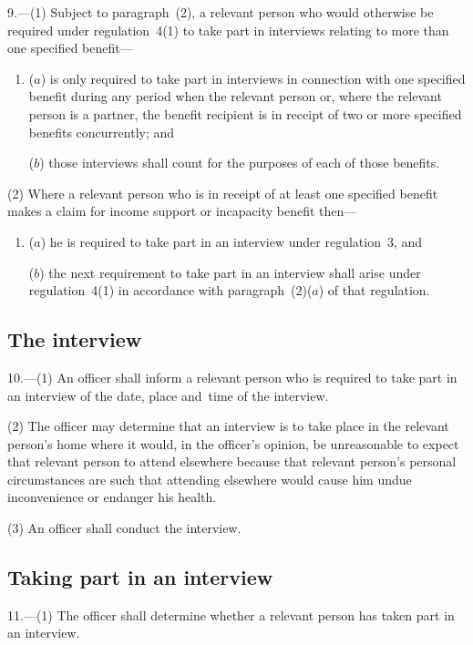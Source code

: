 \documentclass[12pt,a4paper]{article}
\begin{document}
9.---(1)  Subject to paragraph~(2), a relevant person who would otherwise be required under regulation~4(1) to take part in interviews relating to more than one specified benefit—
\begin{enumerate}\item[]
($a$) is only required to take part in interviews in connection with one specified benefit during any period when the relevant person or, where the relevant person is a partner, the benefit recipient is in receipt of two or more specified benefits concurrently; and

($b$) those interviews shall count for the purposes of each of those benefits.
\end{enumerate}

(2) Where a relevant person who is in receipt of at least one specified benefit makes a claim for income support or incapacity benefit then—
\begin{enumerate}\item[]
($a$) he is required to take part in an interview under regulation~3, and

($b$) the next requirement to take part in an interview shall arise under regulation~4(1) in accordance with paragraph~(2)($a$)  of that regulation.
\end{enumerate}

\subsection[10. The interview]{The interview}

10.---(1)  An officer shall inform a relevant person who is required to take part in an interview of the date, place and~time of the interview.

(2) The officer may determine that an interview is to take place in the relevant person’s home where it would, in the officer’s opinion, be unreasonable to expect that relevant person to attend elsewhere because that relevant person’s personal circumstances are such that attending elsewhere would cause him undue inconvenience or endanger his health.

(3) An officer shall conduct the interview.

\subsection[11. Taking part in an interview]{Taking part in an interview}

11.---(1)  The officer shall determine whether a relevant person has taken part in an interview.
\end{document}
